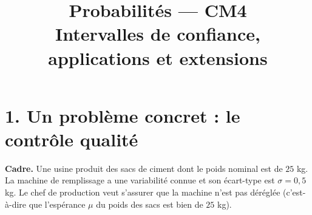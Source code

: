 
\usepackage{tikz}

\newcommand{\atrou}[2][3cm]{%
  \ifthenelse{\boolean{showSolutions}}{%
    \par\vspace{0.5em}%
    \begin{mdframed}[backgroundcolor=ThemeLight, linewidth=0pt,
      skipabove=0pt, skipbelow=0pt,
      innertopmargin=8pt, innerbottommargin=8pt]%
    #2%
    \end{mdframed}%
    \par\vspace{0.5em}%
  }{%
    \par\vspace{0.5em}%
    \noindent\fbox{\begin{minipage}[c][#1]%
      {\dimexpr\textwidth-2\fboxsep-2\fboxrule\relax}%
      \color{white}\rule{0pt}{0pt}%
    \end{minipage}}%
    \par\vspace{0.5em}%
  }%
}

\newcommand{\val}[1]{%
  \ifthenelse{\boolean{showSolutions}}{#1}{\phantom{#1}}%
}

\newcommand{\R}{\mathbb{R}}
\newcommand{\E}{\mathbb{E}}
\newcommand{\Var}{\operatorname{Var}}
\newcommand{\Xbar}{\overline{X}_n}

\title{\sffamily\bfseries Probabilités --- CM4\\[0.3em]
  \Large Intervalles de confiance, applications et extensions}
\author{}
\date{}


\sffamily
\maketitle
\thispagestyle{empty}

\section*{1. Un problème concret : le contrôle qualité}

\textbf{Cadre.} Une usine produit des sacs de ciment dont le poids nominal est de $25$ kg.
La machine de remplissage a une variabilité connue et son écart-type est $\sigma = 0{,}5$ kg. 
Le chef de production veut s'assurer que la machine n'est pas déréglée (c'est-à-dire que l'espérance $\mu$ du poids des sacs est bien de $25$ kg).

